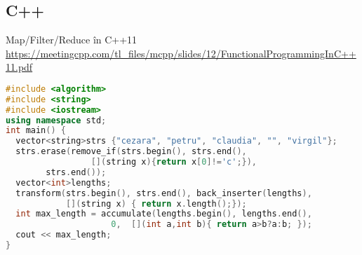 \documentclass[xcolor=pdftex,romanian,colorlinks]{beamer}
\begin{document}
\subsection{C++}

\begin{frame}[fragile]{Map/Filter/Reduce în C++11}
{\url{https://meetingcpp.com/tl_files/mcpp/slides/12/FunctionalProgrammingInC++11.pdf}}
\begin{lstlisting}[language=C++,basicstyle=\small]
#include <algorithm>
#include <string>
#include <iostream>
using namespace std;
int main() {
  vector<string>strs {"cezara", "petru", "claudia", "", "virgil"};
  strs.erase(remove_if(strs.begin(), strs.end(),
                 [](string x){return x[0]!='c';}),
        strs.end());
  vector<int>lengths;   
  transform(strs.begin(), strs.end(), back_inserter(lengths), 
            [](string x) { return x.length();});
  int max_length = accumulate(lengths.begin(), lengths.end(),
                     0,  [](int a,int b){ return a>b?a:b; });     
  cout << max_length;
}
\end{lstlisting}
\end{frame}
\end{document}
